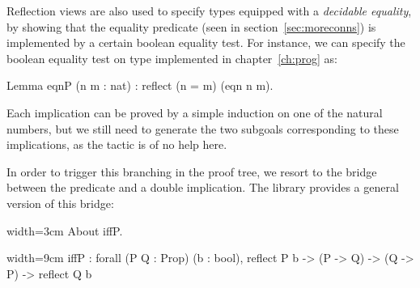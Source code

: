 Reflection views are also used to specify types equipped with a
\emph{decidable equality}, by showing that the equality predicate
 (seen in section~\ref{sec:moreconns}) is implemented by a
certain boolean equality test. For instance, we can specify the
boolean equality test on type  implemented in
chapter~\ref{ch:prog} as:

\begin{coq}{}{}
Lemma eqnP (n m : nat) : reflect (n = m) (eqn n m).
\end{coq}

Each implication can be proved by a simple induction on one of the
natural numbers, but we still need to generate the two subgoals
corresponding to these implications, as the  tactic is of no
help here.



In order to trigger this branching in the proof tree, we resort to the
bridge between the  predicate and a double implication.
The  library provides a general version of
this bridge:

\begin{coq-left}{}{width=3cm}
About iffP.
$~$
$~$
\end{coq-left}
\begin{coqout-right}{}{width=9cm}
iffP : forall (P Q : Prop) (b : bool),
  reflect P b -> (P -> Q) -> (Q -> P) ->
    reflect Q b
\end{coqout-right}

